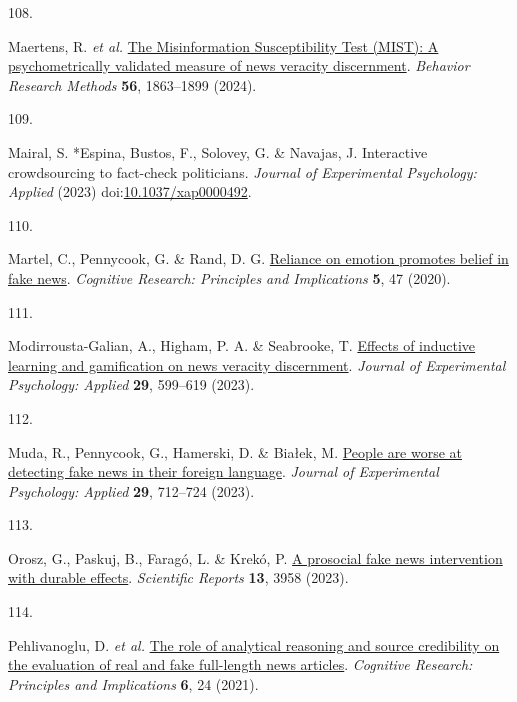 \documentclass[
  doc,floatsintext]{apa6}
\newlength{\cslhangindent}
\newlength{\csllabelwidth}
\newenvironment{CSLReferences}[2] %
 {\begin{list}{}{%
  \setlength{\itemindent}{0pt}
  \setlength{\leftmargin}{0pt}
  \setlength{\parsep}{0pt}
  \ifodd #1
   \setlength{\leftmargin}{\cslhangindent}
   \setlength{\itemindent}{-1\cslhangindent}
  \fi
  \setlength{\itemsep}{#2\baselineskip}}}
 {\end{list}}
\newcommand{\CSLLeftMargin}[1]{\parbox[t]{\csllabelwidth}{\strut#1\strut}}
\newcommand{\CSLRightInline}[1]{\parbox[t]{\linewidth - \csllabelwidth}{\strut#1\strut}}
\begin{document}
\begin{CSLReferences}{0}{0}
\CSLLeftMargin{108. }%
\CSLRightInline{*Maertens, R. \emph{et al.} \href{https://doi.org/10.3758/s13428-023-02124-2}{The Misinformation Susceptibility Test (MIST): A psychometrically validated measure of news veracity discernment}. \emph{Behavior Research Methods} \textbf{56}, 1863--1899 (2024).}

\CSLLeftMargin{109. }%
\CSLRightInline{Mairal, S. *Espina, Bustos, F., Solovey, G. \& Navajas, J. Interactive crowdsourcing to fact-check politicians. \emph{Journal of Experimental Psychology: Applied} (2023) doi:\href{https://doi.org/10.1037/xap0000492}{10.1037/xap0000492}.}

\CSLLeftMargin{110. }%
\CSLRightInline{*Martel, C., Pennycook, G. \& Rand, D. G. \href{https://doi.org/10.1186/s41235-020-00252-3}{Reliance on emotion promotes belief in fake news}. \emph{Cognitive Research: Principles and Implications} \textbf{5}, 47 (2020).}

\CSLLeftMargin{111. }%
\CSLRightInline{*Modirrousta-Galian, A., Higham, P. A. \& Seabrooke, T. \href{https://doi.org/10.1037/xap0000458}{Effects of inductive learning and gamification on news veracity discernment}. \emph{Journal of Experimental Psychology: Applied} \textbf{29}, 599--619 (2023).}

\CSLLeftMargin{112. }%
\CSLRightInline{*Muda, R., Pennycook, G., Hamerski, D. \& Białek, M. \href{https://doi.org/10.1037/xap0000475}{People are worse at detecting fake news in their foreign language}. \emph{Journal of Experimental Psychology: Applied} \textbf{29}, 712--724 (2023).}

\CSLLeftMargin{113. }%
\CSLRightInline{*Orosz, G., Paskuj, B., Faragó, L. \& Krekó, P. \href{https://doi.org/10.1038/s41598-023-30867-7}{A prosocial fake news intervention with durable effects}. \emph{Scientific Reports} \textbf{13}, 3958 (2023).}

\CSLLeftMargin{114. }%
\CSLRightInline{*Pehlivanoglu, D. \emph{et al.} \href{https://doi.org/10.1186/s41235-021-00292-3}{The role of analytical reasoning and source credibility on the evaluation of real and fake full-length news articles}. \emph{Cognitive Research: Principles and Implications} \textbf{6}, 24 (2021).}


\end{CSLReferences}
\end{document}
